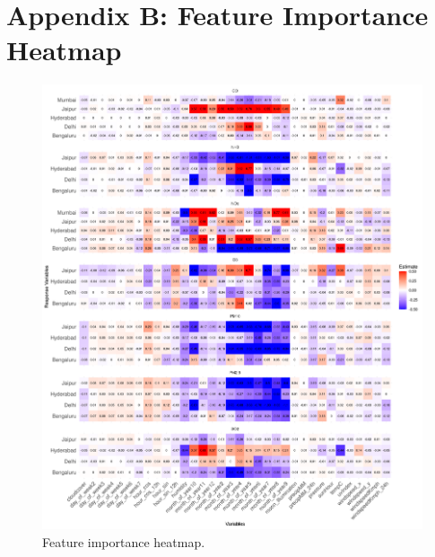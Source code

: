 \documentclass[twoside,11pt]{article}
\begin{document}
\newpage

\section*{Appendix B: Feature Importance Heatmap}

\begin{figure}[H]
  \centering
  \includegraphics[width=\textwidth]{assets/feature-importance-heatmap.png}
  \caption{Feature importance heatmap.}
\end{figure}

\newpage










\end{document}
